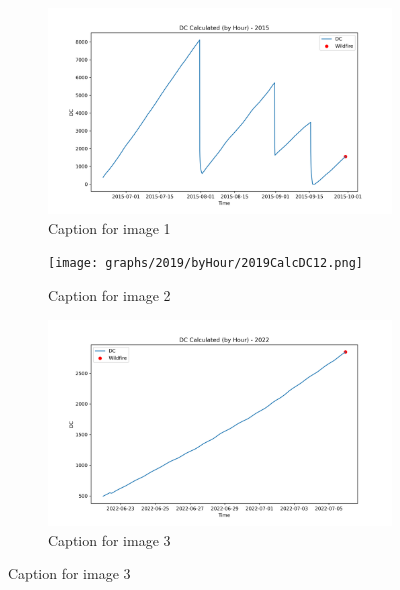 \begin{figure}[h]
	\centering
	\caption{Caption for the whole figure}
	\begin{subfigure}{0.3\textwidth}
		\centering
		\includegraphics[width=\textwidth]{graphs/2015/byHour/2015CalcDC12.png}
		\caption{Caption for image 1}
		\label{fig:img1}
	\end{subfigure}
	\hfill
	\begin{subfigure}{0.3\textwidth}
		\centering
		\texttt{[image: graphs/2019/byHour/2019CalcDC12.png]}
		\caption{Caption for image 2}
		\label{fig:img2}
	\end{subfigure}
	\hfill
	\begin{subfigure}{0.3\textwidth}
		\centering
		\includegraphics[width=\textwidth]{graphs/2022/2022CalcDC12.png}
		\caption{Caption for image 3}
		\label{fig:img3}
	\end{subfigure}
	
	\label{fig:all_images}
\end{figure}

